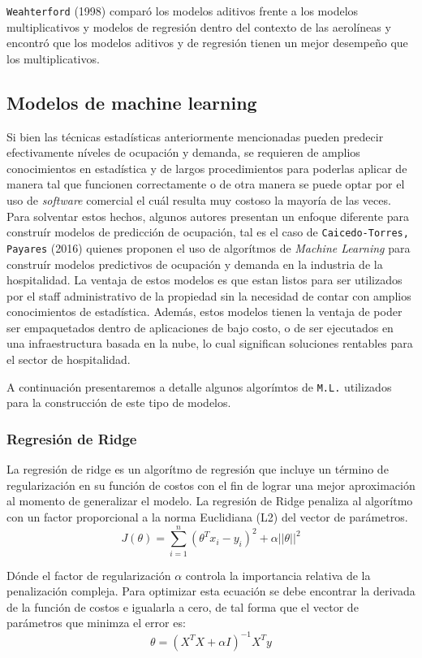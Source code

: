{\texttt{Weahterford} (1998) comparó los modelos aditivos frente a los modelos multiplicativos y modelos de regresión dentro del contexto de las aerolíneas y encontró que los modelos aditivos y de regresión tienen un mejor desempeño que los multiplicativos.

\subsection*{Modelos de machine learning}

Si bien las técnicas estadísticas anteriormente mencionadas pueden predecir efectivamente níveles de ocupación y demanda, se requieren de amplios conocimientos en estadística y de largos procedimientos para poderlas aplicar de manera tal que funcionen correctamente o de otra manera se puede optar por el uso de \emph{software} comercial el cuál resulta muy costoso la mayoría de las veces. Para solventar estos hechos, algunos autores presentan un enfoque diferente para construír modelos de predicción de ocupación, tal es el caso de \texttt{Caicedo-Torres, Payares} (2016) quienes proponen el uso de algorítmos de \emph{Machine Learning} para construír modelos predictivos de ocupación y demanda en la industria de la hospitalidad. La ventaja de estos modelos es que estan listos para ser utilizados por el staff administrativo de la propiedad  sin la necesidad de contar con amplios conocimientos de estadística. Además, estos modelos tienen la ventaja de poder ser empaquetados dentro de aplicaciones de bajo costo, o de ser ejecutados en una infraestructura basada en la nube, lo cual significan soluciones rentables para el sector de hospitalidad.

A continuación presentaremos a detalle algunos algorímtos de \texttt{M.L.} utilizados para la construcción de este tipo de modelos.

\subsubsection*{Regresión de Ridge}

La regresión de ridge es un algorítmo de regresión que incluye un término de regularización en su función de costos con el fin de lograr una mejor aproximación al momento de generalizar el modelo. La regresión de Ridge penaliza al algorítmo con un factor proporcional a la norma Euclidiana (L2) del vector de parámetros. $$J(\theta)=\sum_{i=1}^{n} (\theta^Tx_i - y_i)^2 + \alpha||\theta||^2$$

Dónde el factor de regularización $\alpha$ controla la importancia relativa de la penalización compleja. Para optimizar esta ecuación se debe encontrar la derivada de la función de costos e igualarla a cero, de tal forma que el vector de parámetros que minimza el error es: $$\theta = (X^TX+\alpha I)^{-1} X^T y$$

}
